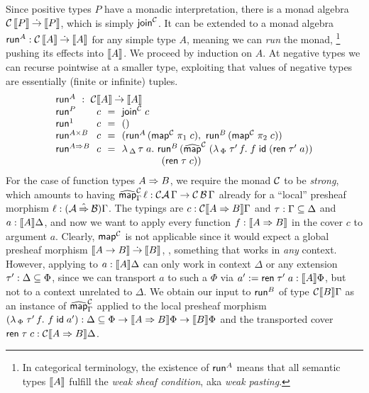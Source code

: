 \documentclass[sigconf,screen,fleqn]{acmart} %
\begin{document}
Since positive types $P$ have a monadic interpretation, there is a
monad algebra %
$\C\,\den P \todot \den P$, which is simply
$\tjoin[\C]$.  It
can be extended to a
monad algebra %
$\trun^A : \C\,\den A \todot \den A$ for any simple
type $A$, meaning we can \emph{run} the monad,
\footnote{In categorical terminology, the existence of
$\trun^A$ means that
all semantic types $\den{A}$ fulfill the \emph{weak sheaf condition},
aka \emph{weak pasting}.}
pushing its effects into $\den A$.%
We proceed by induction on $A$.
At negative types we can recurse pointwise at a smaller type,
exploiting that values of negative types are essentially
(finite or infinite) tuples.
\[
\begin{array}{l@{~~}l@{~~}c@{~~}l}%
  \multicolumn 4 l {\trun^A ~:~ \C \den A \todot \den A} \\
  \trun^P & c & = & \tjoin[\C]\;c \\
  \trun^{\tyone} & c & = & \ttempty
    \\
  \trun^{A \times B} & c & = &
      (\trun^A\,(\tmap[\C]\;\pi_1\;c),\
       \trun^B\,(\tmap[\C]\;\pi_2\;c))
  \\
  \trun^{A \To B} & c  & = & \lambda\,_\Delta \,\tau \; a. \ \trun^B\,
      (\stmap[\C]\;(\lambda\,_\Phi\;\tau'\,f.\;f\;\tid\;(\tren\;\tau'\;a))
  \\ &&& \qquad \qquad (\tren\;\tau\;c))
  \\
\end{array}
\]
For the case of function types $A \To B$, we require the monad $\C$ to be
\emph{strong}, which amounts to having
$\stmap[\C]_\Gamma\, \ell : \C\A\,\Gamma \to \C\,\B\,\Gamma$ already for
a ``local'' presheaf morphism $\ell : (\A \hatto \B)\Gamma$.
The typings are
$c : \C \den{A \To B} \Gamma$ and
$\tau : \Gamma \sublist \Delta$ and
$a : \den A \Delta$, and now we want to apply every function
$f : \den{A \To B}$ %
in the cover $c$ to argument $a$.  Clearly,
$\tmap[\C]$ is not applicable since it would expect a
global presheaf morphism
$\den{A \to B} \todot \den B$, \ie, something that works in \emph{any}
context.  However, applying to $a : \den A \Delta$ can only work in
context $\Delta$ or any extension $\tau' : \Delta \sublist \Phi$,
since we can transport $a$ to such a $\Phi$ via
$a' := \tren\; \tau'\; a : \den A \Phi$, but not to a context unrelated to
$\Delta$.  We obtain our input to $\trun^B$ of type $\C \den B \Gamma$
as an instance of $\stmap[\C]_\Gamma$ applied to the local presheaf morphism
$(\lambda\,_\Phi \; \tau'\, f. \  f\;\tid\;a') :
\Delta \sublist \Phi \to  \den{A \To B}\Phi \to \den B \Phi$
and the transported cover $\tren\;\tau\;c : \C\den{A \To B}\Delta$.
\end{document}
